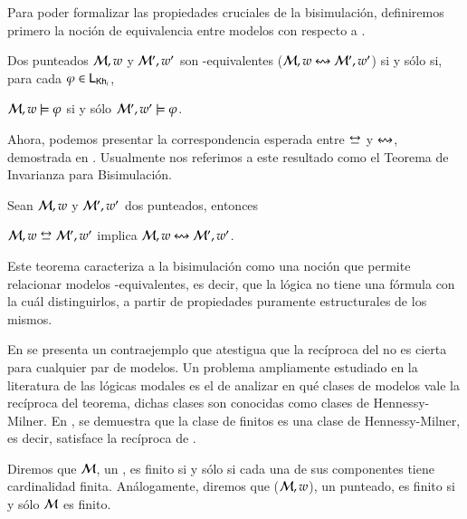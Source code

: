 Para poder formalizar las propiedades cruciales de la bisimulación, definiremos primero la noción de 
equivalencia entre modelos con respecto a \KHilogic.

\begin{definicion}
    Dos \ultss punteados $\mathcal{M},w$ y $\mathcal{M}',w'$ son \KHilogic-equivalentes ($\mathcal{M}, w \mathrel{\leftrightsquigarrow} \mathcal{M}', w'$)
    si y sólo si, para cada $\varphi \in \mathsf{L}_{\mathsf{Kh}_i}$,
    \begin{center}
        $\mathcal{M}, w \models \varphi$ \quad si y sólo \quad $\mathcal{M}', w' \models \varphi$.
    \end{center} 
\end{definicion}

Ahora, podemos presentar la correspondencia esperada entre $\bisim$ y $\mathrel{\leftrightsquigarrow}$, demostrada en \cite{ArecesFSV25,SaraviaPHD}.
Usualmente nos referimos a este resultado como el Teorema de Invarianza para Bisimulación.

\begin{teorema}\label{thm:bisim-implies-equivalence}
    Sean $\mathcal{M},w$ y $\mathcal{M}',w'$ dos \ultss punteados, entonces
    \begin{center}
        $\modults,w \bisim \modults',w'$ implica $\mathcal{M},w \mathrel{\leftrightsquigarrow} \mathcal{M}',w'$.
    \end{center}
\end{teorema}

Este teorema caracteriza a la bisimulación como una noción que permite relacionar modelos \KHilogic-equivalentes, es decir, que la lógica no tiene una fórmula con la cuál distinguirlos,
a partir de propiedades puramente estructurales de los mismos.

En \cite[Sección 2]{FervariVQW21} se presenta un contraejemplo que atestigua que la recíproca del  
no es cierta para cualquier par de modelos. Un problema ampliamente estudiado en la literatura de las lógicas modales es el de analizar 
en qué clases de modelos vale la recíproca del teorema, dichas clases son conocidas como clases de Hennessy-Milner.
En \cite{ArecesFSV25,SaraviaPHD}, se demuestra que la clase de \ults finitos es una clase de Hennessy-Milner, es decir, satisface la 
recíproca de .

Diremos que $\mathcal{M}$, un \ults, es finito si y sólo si cada una de sus componentes tiene cardinalidad finita. Análogamente, diremos que 
($\mathcal{M},w$), un \ults punteado, es finito si y sólo $\mathcal{M}$ es finito. 

